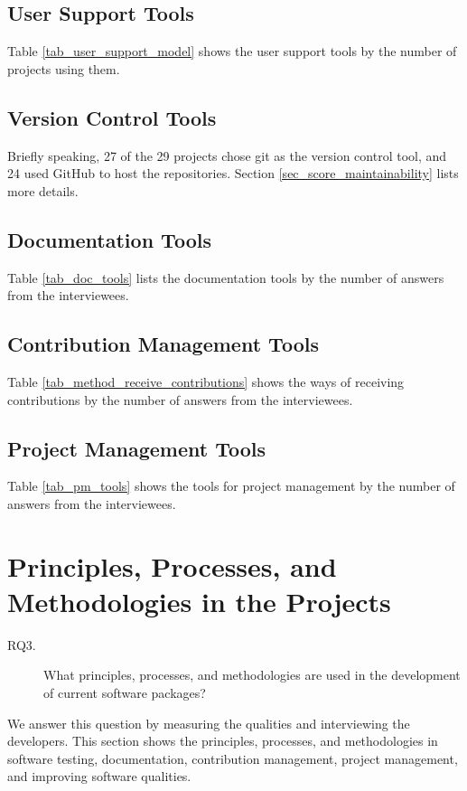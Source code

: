 \subsection{User Support Tools}
Table \ref{tab_user_support_model} shows the user support tools by the number of projects using them.

\subsection{Version Control Tools}
Briefly speaking, 27 of the 29 projects chose git as the version control tool, and 24 used GitHub to host the repositories. Section \ref{sec_score_maintainability} lists more details.

\subsection{Documentation Tools}
Table \ref{tab_doc_tools} lists the documentation tools by the number of answers from the interviewees.

\subsection{Contribution Management Tools}
Table \ref{tab_method_receive_contributions} shows the ways of receiving contributions by the number of answers from the interviewees.

\subsection{Project Management Tools}
Table \ref{tab_pm_tools} shows the tools for project management by the number of answers from the interviewees.

\section{Principles, Processes, and Methodologies in the Projects}
\label{sec_rq_PPM}
\begin{description}
\item[RQ3.] What principles, processes, and methodologies are used in the development of current software packages?
\end{description}

We answer this question by measuring the qualities and interviewing the developers. This section shows the principles, processes, and methodologies in software testing, documentation, contribution management, project management, and improving software qualities.


